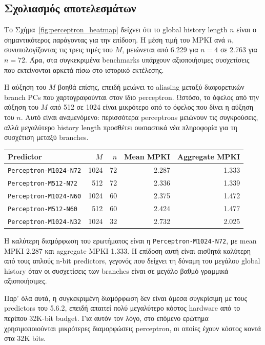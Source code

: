 \documentclass{article}
\begin{document}
\subsection{Σχολιασμός αποτελεσμάτων}

Το Σχήμα~\ref{fig:perceptron_heatmap} δείχνει ότι το global history length \(n\) είναι ο σημαντικότερος παράγοντας για την επίδοση. Η μέση τιμή του MPKI ανά \(n\), συνυπολογίζοντας τις τρεις τιμές του \(M\), μειώνεται από 6.229 για \(n=4\) σε 2.763 για \(n=72\). Άρα, στα συγκεκριμένα benchmarks υπάρχουν αξιοποιήσιμες συσχετίσεις που εκτείνονται αρκετά πίσω στο ιστορικό εκτέλεσης.

Η αύξηση του \(M\) βοηθά επίσης, επειδή μειώνει το aliasing μεταξύ διαφορετικών branch PCs που χαρτογραφούνται στον ίδιο perceptron. Ωστόσο, το όφελος από την αύξηση του \(M\) από 512 σε 1024 είναι μικρότερο από το όφελος που δίνει η αύξηση του \(n\). Αυτό είναι αναμενόμενο: περισσότερα perceptrons μειώνουν τις συγκρούσεις, αλλά μεγαλύτερο history length προσθέτει ουσιαστικά νέα πληροφορία για τη συσχέτιση μεταξύ branches.

\begin{center}
\begin{tabular}{lrrrr}
\toprule
Predictor & \(M\) & \(n\) & Mean MPKI & Aggregate MPKI \\
\midrule
\texttt{Perceptron-M1024-N72} & 1024 & 72 & 2.287 & 1.333 \\
\texttt{Perceptron-M512-N72} & 512 & 72 & 2.336 & 1.339 \\
\texttt{Perceptron-M1024-N60} & 1024 & 60 & 2.375 & 1.472 \\
\texttt{Perceptron-M512-N60} & 512 & 60 & 2.424 & 1.477 \\
\texttt{Perceptron-M1024-N32} & 1024 & 32 & 2.732 & 2.025 \\
\bottomrule
\end{tabular}
\label{tab:perceptron_best}
\end{center}

Η καλύτερη διαμόρφωση του ερωτήματος είναι η \texttt{Perceptron-M1024-N72}, με mean MPKI 2.287 και aggregate MPKI 1.333. Η επίδοση αυτή είναι αισθητά καλύτερη από τους απλούς n-bit predictors, γεγονός που δείχνει τη δύναμη του μεγάλου global history όταν οι συσχετίσεις των branches είναι σε μεγάλο βαθμό γραμμικά αξιοποιήσιμες.

Παρ' όλα αυτά, η συγκεκριμένη διαμόρφωση δεν είναι άμεσα συγκρίσιμη με τους predictors του 5.6.2, επειδή απαιτεί πολύ μεγαλύτερο κόστος hardware από το περίπου 32K-bit budget. Για αυτόν τον λόγο, στο επόμενο ερώτημα χρησιμοποιούνται μικρότερες διαμορφώσεις perceptron, οι οποίες έχουν κόστος κοντά στα 32K bits.
\end{document}
